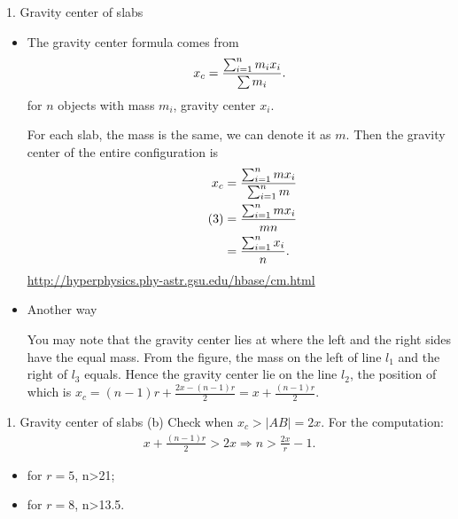 \documentclass{beamer}
\begin{document}
\begin{frame}{1. Gravity center of slabs}
  \begin{itemize}
    \item The gravity center formula comes from
          \begin{align}
            x_c={\sum_{i=1}^n m_i x_i\over {\sum m_i}}.
          \end{align}
          for $n$ objects with mass $m_i$, gravity center $x_i$.
        
          For each slab, the mass is the same, we can denote it as $m$. Then the gravity center of the entire
          configuration is
          \begin{align*}
            x_c&={\sum_{i=1}^n m x_i\over{\sum_{i=1}^n m}}\\\tag{3}
               &={\sum_{i=1}^n m x_i\over {mn}}\\
               &={\sum_{i=1}^n x_i\over n}.
          \end{align*}
          \url{http://hyperphysics.phy-astr.gsu.edu/hbase/cm.html}
          \framebreak
    \item  Another way
          \begin{figure}[!H]
            \centering
            \label{fig:fig001}
          \end{figure}
          You may note that the gravity center lies at where the left and the right sides have the equal mass.
          From the figure, the mass on the left of line $l_1$ and the right of $l_3$ equals.
          Hence the gravity center lie on the line $l_2$, the position of which is $x_{c}=(n-1)r+\frac{2x-(n-1)r}{2}=x+\frac{(n-1)r}{2}$.

        
  \end{itemize}

\end{frame}
\begin{frame}{1. Gravity center of slabs (b)}
  Check when $x_c>|AB|=2x$.  For the computation:
  \begin{align*}
    x+\frac{(n-1)r}{2}>2x\Rightarrow n>\frac{2x}{r}-1.
  \end{align*}
  \begin{itemize}
    \item for $r=5$, n>21;
    \item for $r=8$, n>13.5.
  \end{itemize}
\end{frame}
\end{document}
